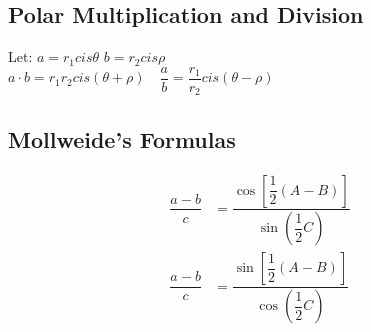 \documentclass{article}
\begin{document}
	
	\subsection{Polar Multiplication and Division}
	\par Let: \quad $a = r_1 cis \theta$ \quad $b = r_2 cis \rho$\\[3ex]
	$a \cdot b = r_1r_2 cis (\theta + \rho) \quad \dfrac{a}{b} = \dfrac{r_1}{r_2} cis (\theta - \rho)$
	
	
	\subsection{Mollweide's Formulas}	
	\begin{align*}
		\dfrac{a - b}{c} &= \dfrac{\cos{\left[ \dfrac{1}{2}(A - B) \right]}}{\sin{\left(  \dfrac{1}{2} C\right)}}\\
		\dfrac{a - b}{c} &= \dfrac{\sin{\left[ \dfrac{1}{2}(A - B) \right]}}{\cos{\left(  \dfrac{1}{2} C\right)}}
	\end{align*}
	
	
	
	
	
	
	
	
	
	
	
	
	
	
	
	
	
	
	
	
	
	
	
	
	
	
	
	
	
	
	
	
	
	
	
	
\end{document}
